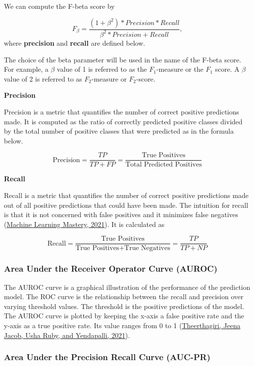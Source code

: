 \documentclass[
  10pt,
]{article}
\begin{document}
We can compute the F-beta score by

\[
  F_\beta = \frac{(1 + \beta^2) * Precision * Recall}{\beta^2 * Precision + Recall},
\]
where \textbf{precision} and \textbf{recall} are defined below.

The choice of the beta parameter will be used in the name of the F-beta score. For example, a \(\beta\) value of 1 is referred to as the \(F_1\)-measure or the \(F_1\) score. A \(\beta\) value of 2 is referred to as \(F_2\)-measure or \(F_2\)-score.

\textbf{Precision}

Precision is a metric that quantifies the number of correct positive predictions made. It is computed as the ratio of correctly predicted positive classes divided by the total number of positive classes that were predicted as in the formula below.

\[
\text{Precision} = \frac{TP}{TP + FP} = \frac{\text{True Positives}}{\text{Total Predicted Positives}}
\]

\textbf{Recall}

Recall is a metric that quantifies the number of correct positive predictions made out of all positive predictions that could have been made. The intuition for recall is that it is not concerned with false positives and it minimizes false negatives (\protect\hyperlink{ref-MLM}{Machine Learning Mastery, 2021}). It is calculated as

\[
\text{Recall} = \frac{\text{True Positives}}{\text{True Positives} + \text{True Negatives}} = \frac{TP}{TP + NP}
\]

\hypertarget{area-under-the-receiver-operator-curve-auroc}{%
\subsubsection{Area Under the Receiver Operator Curve (AUROC)}\label{area-under-the-receiver-operator-curve-auroc}}

The AUROC curve is a graphical illustration of the performance of the prediction model. The
ROC curve is the relationship between the recall and precision over varying threshold values. The threshold is the positive predictions of the model. The AUROC curve is plotted by keeping the x-axis a false positive rate and the y-axis as a true positive rate. Its value ranges from 0 to 1 (\protect\hyperlink{ref-theerthagiri2021prediction}{Theerthagiri, Jeena Jacob, Usha Ruby, and Yendapalli, 2021}).

\hypertarget{area-under-the-precision-recall-curve-auc-pr}{%
\subsubsection{Area Under the Precision Recall Curve (AUC-PR)}\label{area-under-the-precision-recall-curve-auc-pr}}
\end{document}
